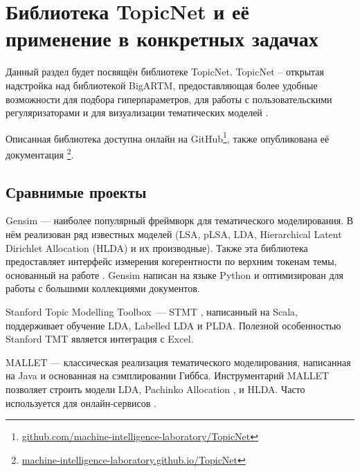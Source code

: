 \chapter{Библиотека TopicNet и её применение в конкретных задачах} 


Данный раздел будет посвящён библиотеке TopicNet. TopicNet -- открытая надстройка над библиотекой BigARTM, предоставляющая более удобные возможности  для подбора гиперпараметров, для работы с пользовательскими регуляризаторами и для визуализации тематических моделей \cite{bulatov2020topicnet}.  

Описанная библиотека доступна онлайн на GitHub\footnote{\url{github.com/machine-intelligence-laboratory/TopicNet}}, также опубликована её документация \footnote{\url{machine-intelligence-laboratory.github.io/TopicNet} }.  

\section{Сравнимые проекты} 


Gensim \cite{rehurek_lrec} --- наиболее популярный фреймворк для тематического моделирования. В нём реализован ряд известных моделей (LSA, pLSA, LDA, Hierarchical Latent Dirichlet Allocation (HLDA) и их производные). Также эта библиотека предоставляет интерфейс измерения когерентности по верхним токенам темы, основанный на работе \cite{roder2015exploring}. Gensim написан на языке Python и оптимизирован для работы с большими коллекциями документов.  

Stanford Topic Modelling Toolbox~--- STMT \cite{stanfordtmt}, написанный на Scala, поддерживает обучение LDA, Labelled LDA и PLDA. Полезной особенностью Stanford TMT является интеграция с Excel.  

MALLET \cite{mccallum2002mallet} --- классическая реализация тематического моделирования, написанная на Java и основанная на сэмплировании Гиббса. Инструментарий MALLET позволяет строить модели LDA, Pachinko Allocation \cite{li2006pachinko}, и HLDA. Часто используется для онлайн-сервисов \cite{pol2017towards}.  

